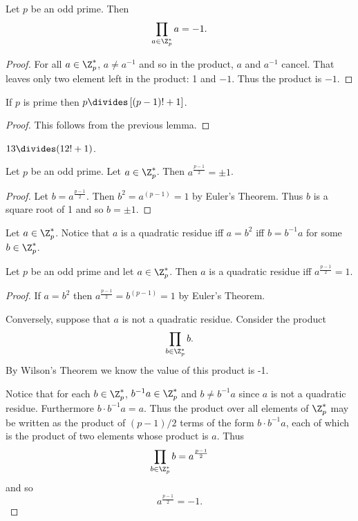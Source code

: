 \documentclass[oneside,12pt]{amsart}
\begin{document}
\begin{lemma}
Let $p$ be an odd prime. Then
$$\prod_{a\in\Z^*_p} a = -1.$$
\end{lemma}
\begin{proof}
For all $a\in\Z^*_p$, $a\not= a^{-1}$ and so in the product, $a$ and $a^{-1}$ cancel. That leaves only two element
left in the product: 1 and $-1$. Thus the product is $-1$.
\end{proof}

\begin{theorem}
If $p$ is prime then $p \divides \left[(p-1)! + 1 \right]$.
\end{theorem}
\begin{proof}
This follows from the previous lemma.
\end{proof}

\begin{in_class_example}
$13\divides (12! + 1)$.
\end{in_class_example}


\begin{lemma}
Let $p$ be an odd prime. Let $a\in\Z^*_p$. Then $a^{\frac{p-1}{2}} = \pm 1$.
\end{lemma}
\begin{proof}
Let $b=a^{\frac{p-1}{2}}$. Then $b^2=a^{(p-1)} = 1$ by Euler's Theorem. Thus
$b$ is a square root of 1 and so $b=\pm 1$.
\end{proof}

Let $a\in\Z^*_p$.
Notice that $a$ is a quadratic residue iff $a = b^2$ iff $b=b^{-1}a$ for some $b\in\Z^*_p$.

\begin{theorem}
Let $p$ be an odd prime and let $a\in\Z^*_p$. Then
$a$ is a quadratic residue iff $a^{\frac{p-1}{2}}=1$.
\end{theorem}
\begin{proof}
If $a=b^2$ then $a^{\frac{p-1}{2}} = b^{(p-1)} =1$ by Euler's Theorem. 

Conversely, suppose that $a$ is not a quadratic residue. Consider the product 
$$\prod_{b\in\Z^*_p} b.$$
By Wilson's Theorem we know the value of this product is -1. 

Notice that for each $b\in\Z^*_p$, $b^{-1} a\in\Z^*_p$ and
$b\not=b^{-1} a$ since $a$ is not a quadratic residue. Furthermore $b\cdot b^{-1}a = a$.
Thus the product over all elements of $\Z^*_p$ may be written as the product of $(p-1)/2$ terms
of the form $b\cdot b^{-1}a$, each of which is the product of two elements whose product is $a$. Thus
$$\prod_{b\in\Z^*_p} b = a^{\frac{p-1}{2}}$$ and so
$$a^{\frac{p-1}{2}} = -1.$$
\end{proof}
\end{document}
